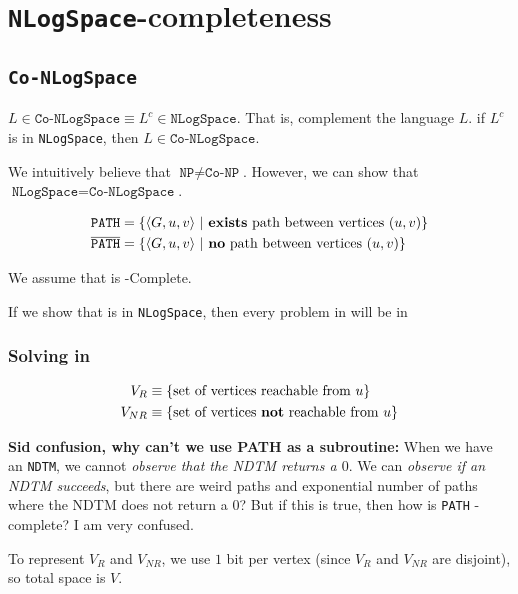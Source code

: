 \chapter{\texttt{NLogSpace}-completeness}

\section{\texttt{Co-NLogSpace}}
$L \in \texttt{Co-NLogSpace} \equiv L^c \in \texttt{NLogSpace}$.
That is, complement the language $L$. if $L^c$ is in \texttt{NLogSpace},
then $L \in \texttt{Co-NLogSpace}$.

We intuitively believe that $\texttt{NP} \neq \texttt{Co-NP}$. However, we can
show that $\texttt{NLogSpace} = \texttt{Co-NLogSpace}$.

\begin{align*}
\texttt{PATH} &= \{ \langle G, u, v \rangle~\vert~\text{\textbf{exists} path between vertices $(u, v)$} \} \\
\overline{\texttt{PATH}} &=  \{ \langle G, u, v \rangle~\vert~\text{\textbf{no} path between vertices $(u, v)$} \}
\end{align*}

We assume that \pathbar is \conlogspace-Complete.

If we show that \pathbar is in \texttt{NLogSpace}, then every problem
in \conlogspace will be in \nlogspace

\subsection{Solving \pathbar in \nlogspace}
\begin{align*}
V_R &\equiv \{ \text{set of vertices reachable from $u$} \} \\
V_{NR} &\equiv \{ \text{set of vertices \textbf{not} reachable from $u$} \} \\
\end{align*}

\textbf{Sid confusion, why can't we use PATH as a subroutine:}
When we have an \texttt{NDTM}, we cannot \textit{observe that the NDTM returns a $0$}.
We can \textit{observe if an NDTM succeeds}, but there are weird paths and exponential
number of paths where the NDTM does not return a $0$? But if this is true,
then how is \texttt{PATH} \nlogspace-complete? I am very confused.

To represent $V_R$ and $V_{NR}$, we use $1$ bit per vertex 
(since $V_R$ and $V_{NR}$ are disjoint), so total space is $V$.

